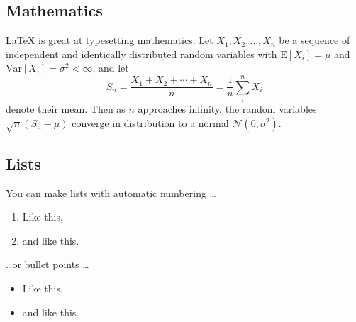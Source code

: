 \documentclass[paper=a4, fontsize=11pt,twoside]{scrartcl}	%
\begin{document}
\subsection{Mathematics}

\LaTeX{} is great at typesetting mathematics. Let $X_1, X_2, \ldots, X_n$ be a sequence of independent and identically distributed random variables with $\text{E}[X_i] = \mu$ and $\text{Var}[X_i] = \sigma^2 < \infty$, and let
$$S_n = \frac{X_1 + X_2 + \cdots + X_n}{n}
      = \frac{1}{n}\sum_{i}^{n} X_i$$
denote their mean. Then as $n$ approaches infinity, the random variables $\sqrt{n}(S_n - \mu)$ converge in distribution to a normal $\mathcal{N}(0, \sigma^2)$.

\subsection{Lists}

You can make lists with automatic numbering \dots

\begin{enumerate}
\item Like this,
\item and like this.
\end{enumerate}
\dots or bullet points \dots
\begin{itemize}
\item Like this,
\item and like this.
\end{itemize}
\end{document}
